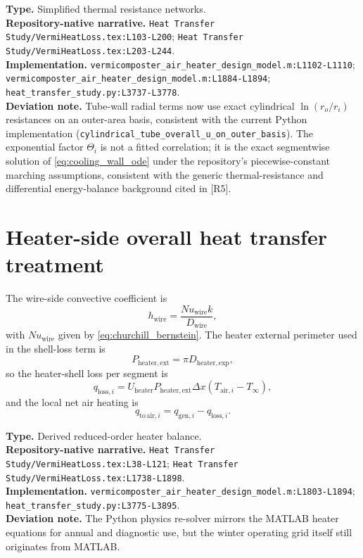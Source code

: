 \documentclass[11pt]{article}
\newcommand{\srcref}[1]{\nolinkurl{#1}}
\newcommand{\filepath}[1]{\nolinkurl{#1}}
\newcommand{\code}[1]{\nolinkurl{#1}}
\begin{document}
\textbf{Type.} Simplified thermal resistance networks. \\
\textbf{Repository-native narrative.} \filepath{Heat Transfer Study/VermiHeatLoss.tex:L103-L200}; \filepath{Heat Transfer Study/VermiHeatLoss.tex:L203-L244}. \\
\textbf{Implementation.} \srcref{vermicomposter_air_heater_design_model.m:L1102-L1110}; \srcref{vermicomposter_air_heater_design_model.m:L1884-L1894}; \srcref{heat_transfer_study.py:L3737-L3778}. \\
\textbf{Deviation note.} Tube-wall radial terms now use exact cylindrical \(\ln(r_o/r_i)\) resistances on an outer-area basis, consistent with the current Python implementation (\code{cylindrical\_tube\_overall\_u\_on\_outer\_basis}). The exponential factor \(\Theta_i\) is not a fitted correlation; it is the exact segmentwise solution of \eqref{eq:cooling_wall_ode} under the repository's piecewise-constant marching assumptions, consistent with the generic thermal-resistance and differential energy-balance background cited in [R5].

\section{Heater-side overall heat transfer treatment}
The wire-side convective coefficient is
\begin{equation}
\label{eq:wire_h}
h_{\mathrm{wire}}=\frac{Nu_{\mathrm{wire}}k}{D_{\mathrm{wire}}},
\end{equation}
with \(Nu_{\mathrm{wire}}\) given by \eqref{eq:churchill_bernstein}. The heater external perimeter used in the shell-loss term is
\begin{equation}
\label{eq:heater_external_perimeter}
P_{\mathrm{heater,ext}}=\pi D_{\mathrm{heater,exp}},
\end{equation}
so the heater-shell loss per segment is
\begin{equation}
\label{eq:heater_loss}
q_{\mathrm{loss},i}=U_{\mathrm{heater}}P_{\mathrm{heater,ext}}\Delta x\left(T_{\mathrm{air},i}-T_{\infty}\right),
\end{equation}
and the local net air heating is
\begin{equation}
\label{eq:heater_net_air}
q_{\mathrm{to\,air},i}=q_{\mathrm{gen},i}-q_{\mathrm{loss},i}.
\end{equation}

\textbf{Type.} Derived reduced-order heater balance. \\
\textbf{Repository-native narrative.} \filepath{Heat Transfer Study/VermiHeatLoss.tex:L38-L121}; \filepath{Heat Transfer Study/VermiHeatLoss.tex:L1738-L1898}. \\
\textbf{Implementation.} \srcref{vermicomposter_air_heater_design_model.m:L1803-L1894}; \srcref{heat_transfer_study.py:L3775-L3895}. \\
\textbf{Deviation note.} The Python physics re-solver mirrors the MATLAB heater equations for annual and diagnostic use, but the winter operating grid itself still originates from MATLAB.
\end{document}
